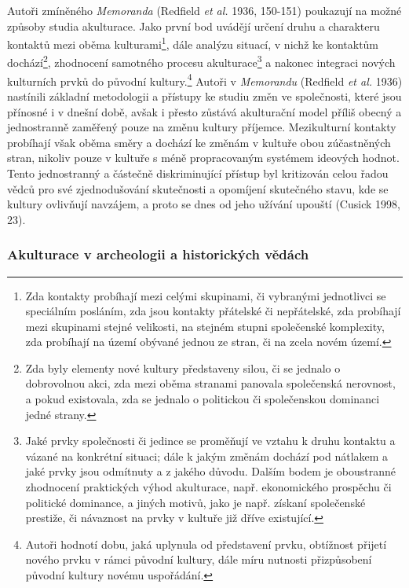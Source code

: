 Autoři zmíněného {\em Memoranda} (Redfield {\em et al.} 1936, 150-151) poukazují na možné způsoby studia akulturace. Jako první bod uvádějí určení druhu a charakteru kontaktů mezi oběma kulturami\footnote{Zda kontakty probíhají mezi celými skupinami, či vybranými jednotlivci se speciálním posláním, zda jsou kontakty přátelské či nepřátelské, zda probíhají mezi skupinami stejné velikosti, na stejném stupni společenské komplexity, zda probíhají na území obývané jednou ze stran, či na zcela novém území.}, dále analýzu situací, v nichž ke kontaktům dochází\footnote{Zda byly elementy nové kultury představeny silou, či se jednalo o dobrovolnou akci, zda mezi oběma stranami panovala společenská nerovnost, a pokud existovala, zda se jednalo o politickou či společenskou dominanci jedné strany.}, zhodnocení samotného procesu akulturace\footnote{Jaké prvky společnosti či jedince se proměňují ve vztahu k druhu kontaktu a vázané na konkrétní situaci; dále k jakým změnám dochází pod nátlakem a jaké prvky jsou odmítnuty a z jakého důvodu. Dalším bodem je oboustranné zhodnocení praktických výhod akulturace, např. ekonomického prospěchu či politické dominance, a jiných motivů, jako je např. získaní společenské prestiže, či návaznost na prvky v kultuře již dříve existující.} a nakonec integraci nových kulturních prvků do původní kultury.\footnote{Autoři hodnotí dobu, jaká uplynula od představení prvku, obtížnost přijetí nového prvku v rámci původní kultury, dále míru nutnosti přizpůsobení původní kultury novému uspořádání.} Autoři v {\em Memorandu} (Redfield {\em et al.} 1936) nastínili základní metodologii a přístupy ke studiu změn ve společnosti, které jsou přínosné i v dnešní době, avšak i přesto zůstává akulturační model příliš obecný a jednostranně zaměřený pouze na změnu kultury příjemce. Mezikulturní kontakty probíhají však oběma směry a dochází ke změnám v kultuře obou zúčastněných stran, nikoliv pouze v kultuře s méně propracovaným systémem ideových hodnot. Tento jednostranný a částečně diskriminující přístup byl kritizován celou řadou vědců pro své zjednodušování skutečnosti a opomíjení skutečného stavu, kde se kultury ovlivňují navzájem, a proto se dnes od jeho užívání upouští (Cusick 1998, 23).

\subsubsection[akulturace-v-archeologii-a-historických-vědách]{Akulturace v archeologii a historických vědách}

